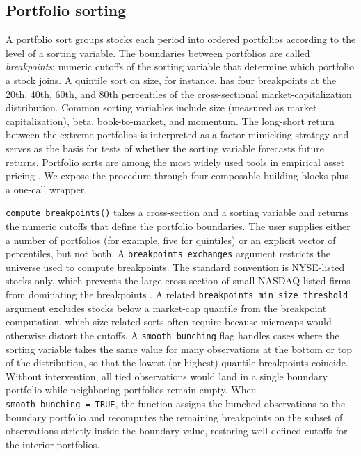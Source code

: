 \documentclass[
  article]{jss}
\begin{document}
\subsection{Portfolio sorting}\label{sec-portfolio-sorting}

A portfolio sort groups stocks each period into ordered portfolios
according to the level of a sorting variable. The boundaries between
portfolios are called \emph{breakpoints}: numeric cutoffs of the sorting
variable that determine which portfolio a stock joins. A quintile sort
on size, for instance, has four breakpoints at the 20th, 40th, 60th, and
80th percentiles of the cross-sectional market-capitalization
distribution. Common sorting variables include size (measured as market
capitalization), beta, book-to-market, and momentum. The long-short
return between the extreme portfolios is interpreted as a
factor-mimicking strategy and serves as the basis for tests of whether
the sorting variable forecasts future returns. Portfolio sorts are among
the most widely used tools in empirical asset pricing \citep{bali.2016}.
We expose the procedure through four composable building blocks plus a
one-call wrapper.

\texttt{compute\_breakpoints()} takes a cross-section and a sorting
variable and returns the numeric cutoffs that define the portfolio
boundaries. The user supplies either a number of portfolios (for
example, five for quintiles) or an explicit vector of percentiles, but
not both. A \texttt{breakpoints\_exchanges} argument restricts the
universe used to compute breakpoints. The standard convention is
NYSE-listed stocks only, which prevents the large cross-section of small
NASDAQ-listed firms from dominating the breakpoints \citep{jensen.2023}.
A related \texttt{breakpoints\_min\_size\_threshold} argument excludes
stocks below a market-cap quantile from the breakpoint computation,
which size-related sorts often require because microcaps would otherwise
distort the cutoffs. A \texttt{smooth\_bunching} flag handles cases
where the sorting variable takes the same value for many observations at
the bottom or top of the distribution, so that the lowest (or highest)
quantile breakpoints coincide. Without intervention, all tied
observations would land in a single boundary portfolio while neighboring
portfolios remain empty. When \texttt{smooth\_bunching\ =\ TRUE}, the
function assigns the bunched observations to the boundary portfolio and
recomputes the remaining breakpoints on the subset of observations
strictly inside the boundary value, restoring well-defined cutoffs for
the interior portfolios.
\end{document}
